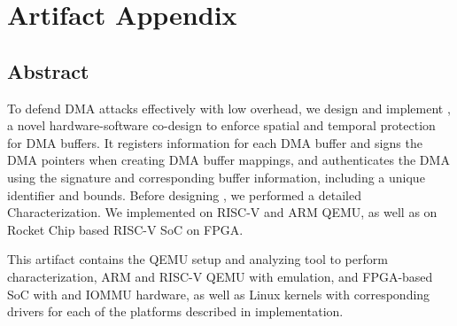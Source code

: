 
\appendix
\section{Artifact Appendix}


\subsection{Abstract}

To defend DMA attacks effectively with low overhead, we design and implement \name, a novel hardware-software co-design to enforce spatial and temporal protection for DMA buffers. It registers information for each DMA buffer and signs the DMA pointers when creating DMA buffer mappings, and authenticates the DMA using the signature and corresponding buffer information, including a unique identifier and bounds.
Before designing \name, we performed a detailed Characterization. We implemented \name on RISC-V and ARM QEMU, as well as on Rocket Chip based RISC-V SoC on FPGA.

This artifact contains the QEMU setup and analyzing tool to perform characterization, ARM and RISC-V QEMU with \name emulation, and FPGA-based SoC with \name and IOMMU hardware, as well as Linux kernels with corresponding drivers for each of the platforms described in implementation.

